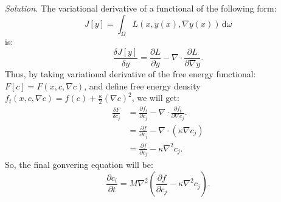 \documentclass[12pt, a4paper, oneside]{article}
\newenvironment{solution}{\par\noindent\emph{Solution. }}{\par}
\begin{document}
\begin{solution}
    The variational derivative of a functional of the following form:
    \[
        J[y] = \int_{\Omega} L(x,y(x),\nabla y(x))\,\mathrm{d}\omega
    \]
    is:
    \[
        \frac{\delta J[y]}{\delta y} = \frac{\partial L}{\partial y}-
        \nabla\cdot\frac{\partial L}{\partial \nabla{y}}.
    \]
    Thus, by taking variational derivative of the free energy functional: \(F[c] = F(x,c,\nabla c)\),
    and define free energy density \(f_t(x,c,\nabla c) = f(c) + \frac{\kappa}{2}\left( \nabla c \right)^2\),
    we will get:
    \begin{align*}
        \frac{\delta F}{\delta c_j}
         & = \frac{\partial f_t}{\partial c_j}-
        \nabla\cdot\frac{\partial f_t}{\partial \nabla{c_j}}.                               \\
         & = \frac{\partial f}{\partial c_j} - \nabla\cdot \left( \kappa \nabla c_j \right) \\
         & = \frac{\partial f}{\partial c_j} - \kappa \nabla^2 c_j.
    \end{align*}
    So, the final gonvering equation will be:
    \[\frac{\partial c_i}{\partial t} = M \nabla^2 \left( \frac{\partial f}{\partial c_j} - \kappa \nabla^2 c_j \right).\]

\end{solution}
\end{document}

